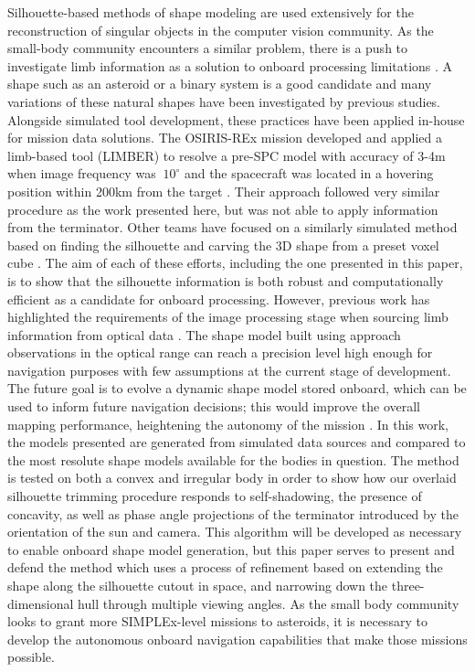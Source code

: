 Silhouette-based methods of shape modeling are used extensively for the reconstruction of singular objects in the computer vision community\cite{Franco2009}\cite{Matusik2000}\cite{Boyer2003}. As the small-body community encounters a similar problem, there is a push to investigate limb information as a solution to onboard processing limitations \cite{Panicucci2020}\cite{Liounis}. A shape such as an asteroid or a binary system is a good candidate and many variations of these natural shapes have been investigated by previous studies. Alongside simulated tool development, these practices have been applied in-house for mission data solutions. The OSIRIS-REx mission developed and applied a limb-based tool (LIMBER) to resolve a pre-SPC model with accuracy of 3-4m when image frequency was $~10^{\circ}$ and the spacecraft was located in a hovering position within 200km from the target \cite{Palmer2019}. Their approach followed very similar procedure as the work presented here, but was not able to apply information from the terminator. Other teams have focused on a similarly simulated method based on finding the silhouette and carving the 3D shape from a preset voxel cube \cite{Bandyonadhyay2019}. The aim of each of these efforts, including the one presented in this paper, is to show that the silhouette information is both robust and computationally efficient as a candidate for onboard processing. However, previous work has highlighted the requirements of the image processing stage when sourcing limb information from optical data \cite{Li2013}. The shape model built using approach observations in the optical range can reach a precision level high enough for navigation purposes with few assumptions at the current stage of development. The future goal is to evolve a dynamic shape model stored onboard, which can be used to inform future navigation decisions; this would improve the overall mapping performance, heightening the autonomy of the mission \cite{Pesce2018}.  
In this work, the models presented are generated from simulated data sources and compared to the most resolute shape models available for the bodies in question. The method is tested on both a convex and irregular body in order to show how our overlaid silhouette trimming procedure responds to self-shadowing, the presence of concavity, as well as phase angle projections of the terminator introduced by the orientation of the sun and camera. This algorithm will be developed as necessary to enable onboard shape model generation, but this paper serves to present and defend the method which uses a process of refinement based on extending the shape along the silhouette cutout in space, and narrowing down the three-dimensional hull through multiple viewing angles. As the small body community looks to grant more SIMPLEx-level missions to asteroids,  it is necessary to develop the autonomous onboard navigation capabilities that make those missions possible. 


